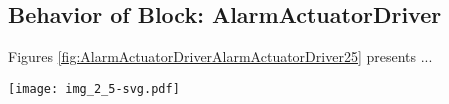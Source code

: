 \subsection{Behavior of Block: AlarmActuatorDriver}
Figures \ref{fig:AlarmActuatorDriverAlarmActuatorDriver25} presents ...
\begin{figure*}[htb]
\centering
\texttt{[image: img\_2\_5-svg.pdf]}
\caption{Diagram "Behavior of Block: AlarmActuatorDriver"}
\label{fig:AlarmActuatorDriverAlarmActuatorDriver25}
\end{figure*}

